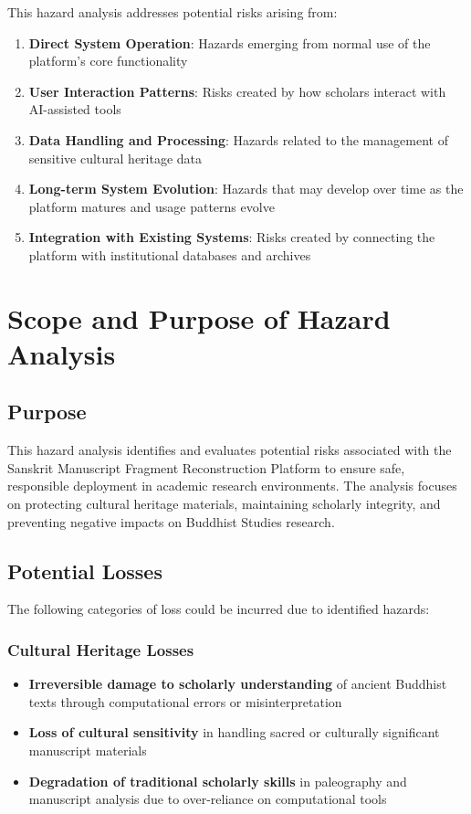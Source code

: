 \documentclass{article}
\begin{document}
This hazard analysis addresses potential risks arising from:

\begin{enumerate}
\item \textbf{Direct System Operation}: Hazards emerging from normal use of the platform's core functionality
\item \textbf{User Interaction Patterns}: Risks created by how scholars interact with AI-assisted tools
\item \textbf{Data Handling and Processing}: Hazards related to the management of sensitive cultural heritage data
\item \textbf{Long-term System Evolution}: Hazards that may develop over time as the platform matures and usage patterns evolve
\item \textbf{Integration with Existing Systems}: Risks created by connecting the platform with institutional databases and archives
\end{enumerate}

\section{Scope and Purpose of Hazard Analysis}

\subsection{Purpose}

This hazard analysis identifies and evaluates potential risks associated with the Sanskrit Manuscript Fragment Reconstruction Platform to ensure safe, responsible deployment in academic research environments. The analysis focuses on protecting cultural heritage materials, maintaining scholarly integrity, and preventing negative impacts on Buddhist Studies research.

\subsection{Potential Losses}

The following categories of loss could be incurred due to identified hazards:

\subsubsection{Cultural Heritage Losses}
\begin{itemize}
\item \textbf{Irreversible damage to scholarly understanding} of ancient Buddhist texts through computational errors or misinterpretation
\item \textbf{Loss of cultural sensitivity} in handling sacred or culturally significant manuscript materials
\item \textbf{Degradation of traditional scholarly skills} in paleography and manuscript analysis due to over-reliance on computational tools
\end{itemize}
\end{document}
